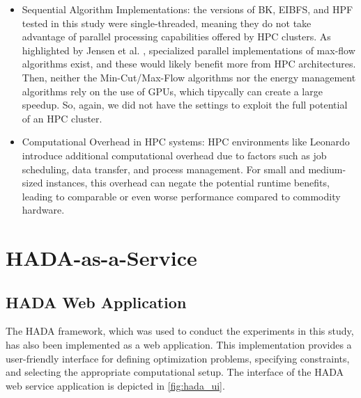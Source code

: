 \documentclass[a4paper,singleside,12pt]{report} %
\begin{document}
\begin{itemize}
    \item Sequential Algorithm Implementations: the versions of BK, EIBFS, and HPF tested in this study were single-threaded, meaning they do not take advantage of parallel 
    processing capabilities offered by HPC clusters. As highlighted by Jensen et al. \cite{Jensen2023Maxflow}, specialized parallel implementations of max-flow algorithms exist, 
    and these would likely benefit more from HPC architectures. Then, neither the Min-Cut/Max-Flow algorithms nor the energy management algorithms rely on the use of GPUs, 
    which tipycally can create a large speedup. So, again, we did not have the settings to exploit the full potential of an HPC cluster.
    \item Computational Overhead in HPC systems: HPC environments like Leonardo introduce additional computational overhead due to factors such as job scheduling, data transfer, 
    and process management. For small and medium-sized instances, this overhead can negate the potential runtime benefits, leading to comparable or even worse performance compared 
    to commodity hardware. %
\end{itemize}

\chapter{HADA-as-a-Service}

\section{HADA Web Application}

The HADA framework, which was used to conduct the experiments in this study, has also been implemented as a web application. This implementation provides a user-friendly interface 
for defining optimization problems, specifying constraints, and selecting the appropriate computational setup. The interface of the HADA web service application is depicted in 
\ref{fig:hada_ui}.
\end{document}

